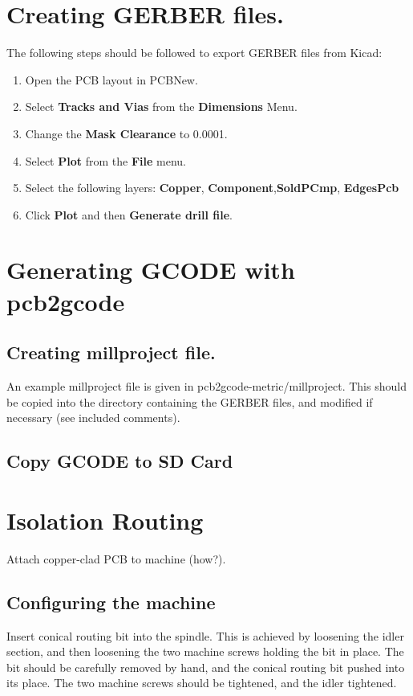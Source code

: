 \documentclass[a4paper,11pt]{article}  %
\begin{document}
\section{Creating GERBER files.}
The following steps should be followed to export GERBER files from Kicad:

\begin{enumerate}
	\item	Open the PCB layout in PCBNew.
	\item	Select \textbf{Tracks and Vias} from the \textbf{Dimensions} Menu.
	\item	Change the \textbf{Mask Clearance} to 0.0001.
	\item	Select \textbf{Plot} from the \textbf{File} menu.
	\item	Select the following layers: \textbf{Copper}, \textbf{Component},\textbf{SoldPCmp}, \textbf{EdgesPcb}
	\item	Click \textbf{Plot} and then \textbf{Generate drill file}.
\end{enumerate}

\section{Generating GCODE with pcb2gcode}
\subsection{Creating millproject file.}
An example millproject file is given in pcb2gcode-metric/millproject. This should be copied
into the directory containing the GERBER files, and modified if necessary (see included comments).

\subsection{Copy GCODE to SD Card}

\section{Isolation Routing}
Attach copper-clad PCB to machine (how?).

\subsection{Configuring the machine}
Insert conical routing bit into the spindle. This is achieved by loosening
the idler section, and then loosening the two machine screws holding the bit in place.
The bit should be carefully removed by hand, and the conical routing bit 
pushed into its place. The two machine screws should be tightened, and the idler
tightened.
\end{document}
